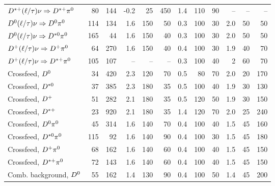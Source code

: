 \documentclass[6pt]{article}
\begin{document}
\begin{tabular}{l r r r r r r r r r r r}
$D^{*+}(\ell/\tau)\nu\Rightarrow D^{*+}\pi^0  $   &    80    &  144   &  -0.2  &   25 &  450  &  1.4    &  110  &  90   &  --     & --  & --   \\ 
$D^0(\ell/\tau)\nu\Rightarrow D^0\pi^0          $   &    114   &  134   &  1.6   &  150 &   50  &  0.3    &  100  &  30   &  2.0    & 50  & 50   \\ 
$D^0(\ell/\tau)\nu\Rightarrow D^{*0}\pi^0      $   &    165   &  44    &  1.6   &  150 &   40  &  0.3    &  100  &  30   &  2.0    & 50  & 50   \\ 
$D^+(\ell/\tau)\nu\Rightarrow D^+\pi^0          $   &    64    &  270   &  1.6   &  150 &   40  &  0.4    &  100  &  30   &  1.9    & 40  & 70   \\ 
$D^+(\ell/\tau)\nu\Rightarrow D^{*+}\pi^0      $   &    105   &  107   &  --    &  --  &   --  &  0.3    &  100  &  40   &  2      & 60  & 70   \\ \hline 	   
Crossfeed, $D^0                               $   &    34    &  420   &  2.3   &  120 &   70  &  0.5    &  80   & 70    &  2.0    & 20  & 170  \\ 
Crossfeed, $D^{*0}                           $   &    37    &  385   &  2.3   &  180 &   35  &  0.5    &  100  &  40   &  1.9    & 30  & 130  \\ 
Crossfeed, $D^+                               $   &    51    &  282   &  2.1   &  180 &   35  &  0.5    &  120  &  50   &  1.9    & 30  & 150  \\ 
Crossfeed, $D^{*+}                           $   &    23    &  920   &  2.1   &  180 &   35  &  1.4    &  120  &  70   &  2.0    & 25  & 240  \\ 
Crossfeed, $D^0\pi^0                          $   &    45    &  314   &  1.6   &  140 &   70  &  0.4    &  100  &  40   &  1.5    & 45  & 160  \\ 
Crossfeed, $D^{*0}\pi^0                      $   &    115   &  92    &  1.6   &  140 &   90  &  0.4    &  100  &  30   &  1.5    & 45  & 180  \\ 
Crossfeed, $D^+\pi^0                          $   &    68    &  162   &  1.6   &  140 &   60  &  0.4    &  100  &  40   &  1.5    & 45  & 150  \\ 
Crossfeed, $D^{*+}\pi^0                      $   &    72    &  143   &  1.6   &  140 &   60  &  0.4    &  100  &  40   &  1.5    & 45  & 150  \\ 
Comb. background, $D^0                        $   &    55    &  162   &  1.4   &  130 &   90  &  0.4    &  100  &  50   &  1.4    & 45  & 200  \\ 

\end{tabular}
\end{document}
